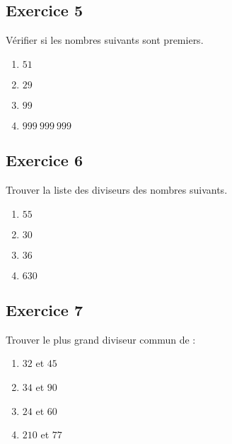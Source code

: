 \documentclass[12 pt]{extarticle}
\theoremstyle{plain}
\begin{document}
\subsection*{Exercice 5}
Vérifier si les nombres suivants sont premiers.
\begin{enumerate}
\item $51$
\item $29$
\item $99$
\item $999\ 999\ 999$
\end{enumerate}

\subsection*{Exercice 6}

Trouver la liste des diviseurs des nombres suivants. 

\begin{enumerate}
\item $55$
\item $30$
\item $36$
\item $630$

\end{enumerate}

\subsection*{Exercice 7}

Trouver le plus grand diviseur commun de : 

\begin{enumerate}
\item $32$ et $45$ 
\item $34$ et $90$
\item $24$ et $60$
\item $210$ et $77$
\end{enumerate}


 	
\end{document}
